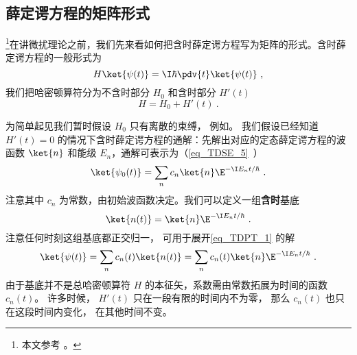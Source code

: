 

\subsection{薛定谔方程的矩阵形式}
\footnote{本文参考 \cite{GriffQ}。}在讲微扰理论之前，我们先来看如何把含时薛定谔方程写为矩阵的形式。含时薛定谔方程的一般形式为
\begin{equation}\label{eq_TDPT_1}
H \ket{\psi(t)} = \I\hbar \pdv{t} \ket{\psi(t)}~,
\end{equation}
我们把哈密顿算符分为不含时部分 $H_0$ 和含时部分 $H'(t)$
\begin{equation}
H = H_0 + H'(t)~.
\end{equation}

为简单起见我们暂时假设 $H_0$ 只有离散的束缚， 例如。 我们假设已经知道 $H'(t) = 0$ 的情况下含时薛定谔方程的通解：先解出对应的定态薛定谔方程的波函数 $\ket{n}$ 和能级 $E_n$，通解可表示为（\autoref{eq_TDSE_5}~）
\begin{equation}
\ket{\psi_0(t)} = \sum_n c_n \ket{n} \E^{-\I E_n t/\hbar}~.
\end{equation}
注意其中 $c_n$ 为常数，由初始波函数决定。我们可以定义一组\textbf{含时}基底
\begin{equation}
\ket{n(t)} = \ket{n} \E^{-\I E_n t/\hbar}~.
\end{equation}
注意任何时刻这组基底都正交归一， 可用于展开\autoref{eq_TDPT_1} 的解
\begin{equation}
\ket{\psi(t)} = \sum_n c_n(t) \ket{n(t)} = \sum_n c_n(t) \ket{n} \E^{-\I E_n t/\hbar}~.
\end{equation}
由于基底并不是总哈密顿算符 $H$ 的本征矢，系数需由常数拓展为时间的函数 $c_n(t)$。 许多时候， $H'(t)$ 只在一段有限的时间内不为零， 那么 $c_n(t)$ 也只在这段时间内变化， 在其他时间不变。

